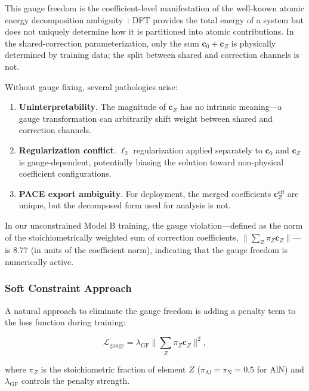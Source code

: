 \documentclass[twoside,prb,aps,floatfix,superscriptaddress,longbibliography]{revtex4-2}
\begin{document}
This gauge freedom is the coefficient-level manifestation of the well-known atomic energy decomposition ambiguity~\cite{Yoo2019AtomicEnergyMapping}: DFT provides the total energy of a system but does not uniquely determine how it is partitioned into atomic contributions. In the shared-correction parameterization, only the sum $\mathbf{c}_0 + \mathbf{c}_Z$ is physically determined by training data; the split between shared and correction channels is not.

Without gauge fixing, several pathologies arise:
\begin{enumerate}[label=(\roman*)]
    \item \textbf{Uninterpretability}. The magnitude of $\mathbf{c}_Z$ has no intrinsic meaning---a gauge transformation can arbitrarily shift weight between shared and correction channels.
    \item \textbf{Regularization conflict}. $\ell_2$ regularization applied separately to $\mathbf{c}_0$ and $\mathbf{c}_Z$ is gauge-dependent, potentially biasing the solution toward non-physical coefficient configurations.
    \item \textbf{PACE export ambiguity}. For deployment, the merged coefficients $\mathbf{c}_Z^{\mathrm{eff}}$ are unique, but the decomposed form used for analysis is not.
\end{enumerate}

In our unconstrained Model B training, the gauge violation---defined as the norm of the stoichiometrically weighted sum of correction coefficients, $\lVert \sum_Z \pi_Z \mathbf{c}_Z \rVert$---is $8.77$ (in units of the coefficient norm), indicating that the gauge freedom is numerically active.

\subsubsection{Soft Constraint Approach}

A natural approach to eliminate the gauge freedom is adding a penalty term to the loss function during training:

\begin{equation}
\mathcal{L}_{\mathrm{gauge}} = \lambda_{\mathrm{GF}} \Big\lVert \sum_Z \pi_Z \mathbf{c}_Z \Big\rVert^2,
\label{eq:soft_gauge}
\end{equation}

where $\pi_Z$ is the stoichiometric fraction of element $Z$ ($\pi_{\mathrm{Al}} = \pi_{\mathrm{N}} = 0.5$ for AlN) and $\lambda_{\mathrm{GF}}$ controls the penalty strength.
\end{document}
